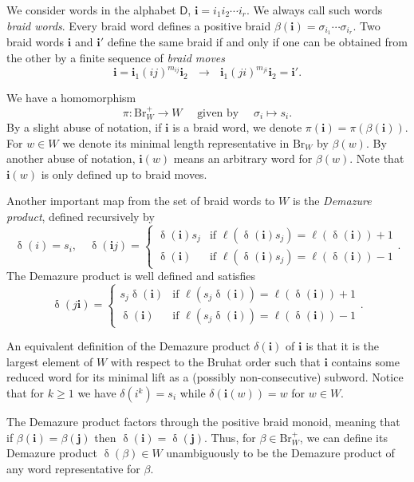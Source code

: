 \documentclass[a4paper, 11pt]{amsart}
\newcommand{\Br}{\mathrm{Br}}
\newcommand{\word}[1]{\mathbf{#1}}
\DeclareMathOperator{\dem}{\delta}
\newcommand{\dynkin}{\mathsf{D}}
\theoremstyle{definition}
\begin{document}
We  consider words in the alphabet $\dynkin$, $\word{i} = i_1i_2\cdots i_r$. 
We always call such words \emph{braid words}. Every braid word defines a positive braid $\beta(\word{i}) = \sigma_{i_1}\cdots \sigma_{i_r}$. 
Two braid words $\word{i}$ and $\word{i}'$ define the same braid if and only if one can be obtained from the other by a finite sequence of  \emph{braid moves} 
\[
\word{i}=\word{i}_1 (ij)^{m_{ij}}\word{i}_2\,\,\,\, \to \,\,\,\, \word{i}_1 (ji)^{m_{ji}}\word{i}_2=\word{i}'.
\]



We have a homomorphism 
\[
\pi:\Br_W^+\to W \quad \text{ given by }\quad \sigma_i\mapsto s_i.
\]
By a slight abuse of notation, if $\word{i}$ is a braid word, we denote $\pi(\word{i}) = \pi(\beta(\word{i}))$. 
For $w\in W$ we denote its minimal length representative in $\Br_W$ by $\beta(w)$. By another abuse of notation, $\word{i}(w)$ 
means an arbitrary word for $\beta(w)$. Note that $\word{i}(w)$ is only defined up to braid moves. 


Another important map from the set of braid words to $W$ is the \emph{Demazure product}, defined recursively by
\[
\dem(i)=s_i, \quad \dem(\word{i} j)=\left\{ \begin{matrix}
    \dem(\word{i})s_j & \text{if } \ell(\dem(\word{i})s_j)=\ell(\dem(\word{i}))+1 \\
    \dem(\word{i}) & \text{if } \ell(\dem(\word{i})s_j)=\ell(\dem(\word{i}))-1
\end{matrix}\right..
\]
The Demazure product is well defined and satisfies
\[
\dem(j\word{i})=\left\{ \begin{matrix}
    s_j\dem(\word{i}) & \text{if } \ell(s_j\dem(\word{i}))=\ell(\dem(\word{i}))+1 \\
    \dem(\word{i}) & \text{if } \ell(s_j\dem(\word{i}))=\ell(\dem(\word{i}))-1
\end{matrix}\right..
\]

An equivalent definition of the Demazure product $\delta(\word{i})$ of $\word{i}$ is that it is the largest element of $W$ with respect to the Bruhat order such that $\word{i}$ contains some reduced word for its minimal lift as a (possibly non-consecutive) subword.
Notice that for $k\ge 1$ we have $\delta(i^k)=s_i$ while $\delta(\word{i}(w))=w$ for $w\in W$. 

The Demazure product factors through the positive braid monoid, meaning that if $\beta(\word{i}) = \beta(\word{j})$ then $\dem(\word{i}) = \dem(\word{j})$. Thus, for $\beta \in \Br_W^{+}$, we can define its Demazure product $\dem(\beta) \in W$ unambiguously to be the Demazure product of any word representative for $\beta$.
\end{document}
